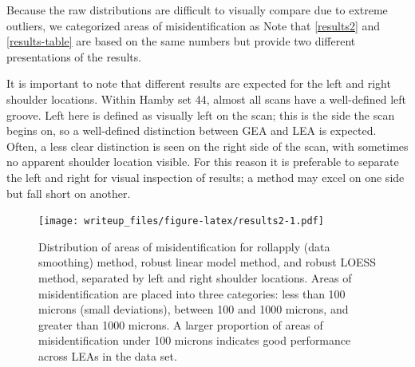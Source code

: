 \documentclass[12pt]{article}
\begin{document}
Because the raw distributions are difficult to visually compare due to
extreme outliers, we categorized areas of misidentification as
{}
Note that \autoref{results2} and \autoref{results-table} are based on
the same numbers but provide two different presentations of the results.

It is important to note that different results are expected for the left
and right shoulder locations. Within Hamby set 44, almost all scans have
a well-defined left groove. Left here is defined as visually left on the
scan; this is the side the scan begins on, so a well-defined distinction
between GEA and LEA is expected. Often, a less clear distinction is seen
on the right side of the scan, with sometimes no apparent shoulder
location visible.
{\color{teal}{This may be due to the left shoulder corresponding to the leading edge in the twist of a bullet as it is propelled through a gun barrel.}}
For this reason it is preferable to separate the left and right for
visual inspection of results; a method may excel on one side but fall
short on another.

\begin{figure}
\centering
\texttt{[image: writeup\_files/figure-latex/results2-1.pdf]}
\caption{\label{results2}Distribution of areas of misidentification for
rollapply (data smoothing) method, robust linear model method, and
robust LOESS method, separated by left and right shoulder locations.
Areas of misidentification are placed into three categories: less than
100 microns (small deviations), between 100 and 1000 microns, and
greater than 1000 microns. A larger proportion of areas of
misidentification under 100 microns indicates good performance across
LEAs in the data set.}
\end{figure}
\end{document}
